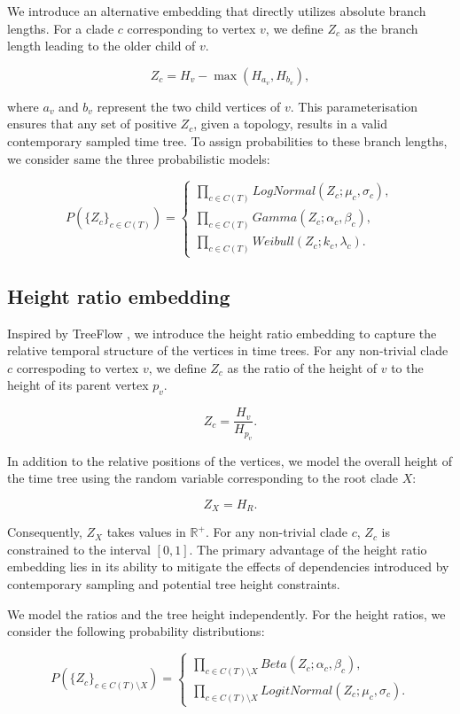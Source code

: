 \documentclass[10pt,letterpaper]{article}
\begin{document}
We introduce an alternative embedding that directly utilizes absolute branch lengths. For a clade $c$ corresponding to vertex $v$, we define $Z_c$ as the branch length leading to the older child of $v$.

$$
Z_c = H_v - \max{\left(H_{a_v}, H_{b_v}\right)},
$$

where $a_v$ and $b_v$ represent the two child vertices of $v$. This parameterisation ensures that any set of positive $Z_c$, given a topology, results in a valid contemporary sampled time tree. To assign probabilities to these branch lengths, we consider same the three probabilistic models:

$$
P(\{Z_c\}_{c \in C(T)}) = \begin{cases}
	\prod_{c \in C(T)}{LogNormal(Z_c; \mu_c, \sigma_c)}, \\
	\prod_{c \in C(T)}{Gamma(Z_c; \alpha_c, \beta_c)}, \\
	\prod_{c \in C(T)}{Weibull(Z_c; k_c, \lambda_c)}.
\end{cases}
$$

\subsection*{Height ratio embedding}

Inspired by TreeFlow \cite{treeflow}, we introduce the height ratio embedding to capture the relative temporal structure of the vertices in time trees. For any non-trivial clade $c$ correspoding to vertex $v$, we define $Z_c$ as the ratio of the height of $v$ to the height of its parent vertex $p_v$.

$$
Z_c = \frac{H_v}{H_{p_v}}.
$$

In addition to the relative positions of the vertices, we model the overall height of the time tree using the random variable corresponding to the root clade $X$:

$$
Z_X = H_R.
$$

Consequently, $Z_X$ takes values in $\mathbb{R}^+$. For any non-trivial clade $c$, $Z_c$ is constrained to the interval $[0, 1]$. The primary advantage of the height ratio embedding lies in its ability to mitigate the effects of dependencies introduced by contemporary sampling and potential tree height constraints.

We model the ratios and the tree height independently. For the height ratios, we consider the following probability distributions:

$$
P(\{Z_c\}_{c \in C(T) \setminus X}) = \begin{cases}
	\prod_{c \in C(T) \setminus X}{Beta(Z_c; \alpha_c, \beta_c)}, \\
	\prod_{c \in C(T) \setminus X}{LogitNormal(Z_c; \mu_c, \sigma_c)}.
\end{cases}
$$
\end{document}
